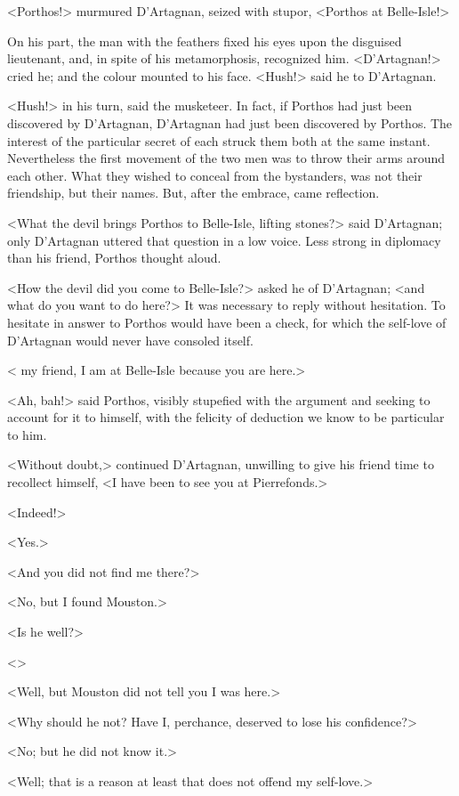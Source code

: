 <Porthos!> murmured D'Artagnan, seized with stupor, <Porthos at Belle-Isle!>

On his part, the man with the feathers fixed his eyes upon the disguised lieutenant, and, in spite of his metamorphosis, recognized him. <D'Artagnan!> cried he; and the colour mounted to his face. <Hush!> said he to D'Artagnan.

<Hush!> in his turn, said the musketeer. In fact, if Porthos had just been discovered by D'Artagnan, D'Artagnan had just been discovered by Porthos. The interest of the particular secret of each struck them both at the same instant. Nevertheless the first movement of the two men was to throw their arms around each other. What they wished to conceal from the bystanders, was not their friendship, but their names. But, after the embrace, came reflection.

<What the devil brings Porthos to Belle-Isle, lifting stones?> said D'Artagnan; only D'Artagnan uttered that question in a low voice. Less strong in diplomacy than his friend, Porthos thought aloud.

<How the devil did you come to Belle-Isle?> asked he of D'Artagnan; <and what do you want to do here?> It was necessary to reply without hesitation. To hesitate in answer to Porthos would have been a check, for which the self-love of D'Artagnan would never have consoled itself.

< my friend, I am at Belle-Isle because you are here.>

<Ah, bah!> said Porthos, visibly stupefied with the argument and seeking to account for it to himself, with the felicity of deduction we know to be particular to him.

<Without doubt,> continued D'Artagnan, unwilling to give his friend time to recollect himself, <I have been to see you at Pierrefonds.>

<Indeed!>

<Yes.>

<And you did not find me there?>

<No, but I found Mouston.>

<Is he well?>

<>

<Well, but Mouston did not tell you I was here.>

<Why should he not? Have I, perchance, deserved to lose his confidence?>

<No; but he did not know it.>

<Well; that is a reason at least that does not offend my self-love.>

